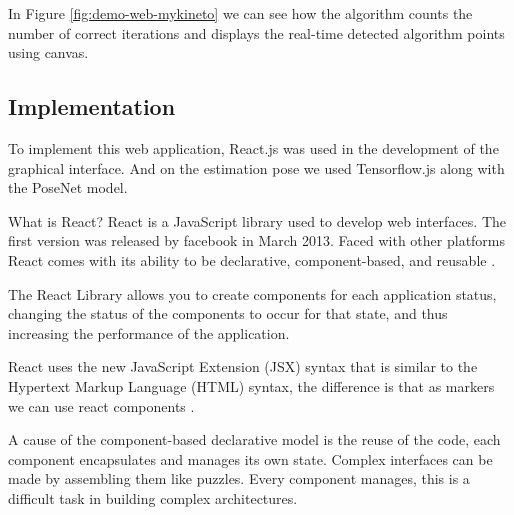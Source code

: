 In Figure \ref{fig:demo-web-mykineto} we can see how the algorithm counts the number of correct iterations and displays the real-time detected algorithm points using canvas.


\subsection{Implementation}

To implement this web application, React.js was used in the development of the graphical interface.
And on the estimation pose we used Tensorflow.js along with the PoseNet model.

What is React? React is a JavaScript library used to develop web interfaces.
The first version was released by facebook in March 2013. Faced with other platforms React comes with
its ability to be declarative, component-based, and reusable \cite{fb-react}.

The React Library allows you to create components for each application status, changing the status of the components to occur for that state, and thus increasing the performance of the application.


React uses the new JavaScript Extension (JSX) syntax that is similar to the Hypertext Markup Language (HTML) syntax, the difference is that as markers we can use react components \cite{jsx-react}.

A cause of the component-based declarative model is the reuse of the code, each component encapsulates and manages its own state. Complex interfaces can be made by assembling them like puzzles. Every component manages, this is a difficult task in building complex architectures.

